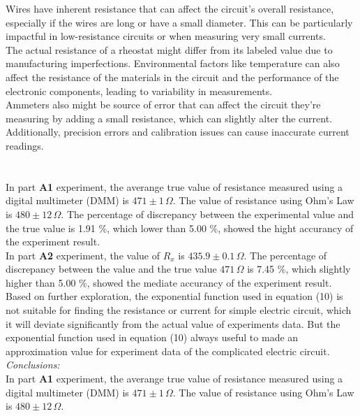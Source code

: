 \documentclass[twocolumn,a4paper,11pt]{article}
\begin{document}
Wires have inherent resistance that can affect the circuit's overall resistance, especially if the wires are long or have a small diameter. This can be particularly impactful in low-resistance circuits or when measuring very small currents.\\

The actual resistance of a rheostat might differ from its labeled value due to manufacturing imperfections. Environmental factors like temperature can also affect the resistance of the materials in the circuit and the performance of the electronic components, leading to variability in measurements.\\

Ammeters also might be source of error that can affect the circuit they're measuring by adding a small resistance, which can slightly alter the current. Additionally, precision errors and calibration issues can cause inaccurate current readings.\\
\\
\newpage
{}\\

In part \textbf{A1} experiment, the averange true value of resistance measured using a digital multimeter   (DMM) is $471 \pm 1 \,\Omega$. The value of resistance using Ohm's Law is $480 \pm 12\,\Omega$. The percentage of discrepancy between the experimental value and the true value is 1.91 \%, which lower than 5.00 \%, showed the hight accurancy of the experiment result.\\

In part \textbf{A2} experiment, the value of $R_x$ is $435.9 \pm 0.1\,\Omega$. The percentage of discrepancy between the value and the true value $471\,\Omega$ is 7.45 \%, which slightly higher than 5.00 \%, showed the mediate accurancy of the experiment result.\\

Based on further exploration, the exponential function used in equation (10) is not suitable for finding the resistance or current for simple electric circuit, which it will deviate significantly from the actual value of experiments data. But the exponential function used in equation (10) always useful to made an approximation value for experiment data of the complicated electric circuit. \\

\noindent\textit{Conclusions:} \\

In part \textbf{A1} experiment, the averange true value of resistance measured using a digital multimeter   (DMM) is $471 \pm 1 \,\Omega$. The value of resistance using Ohm's Law is $480 \pm 12\,\Omega$.\\
\end{document}
